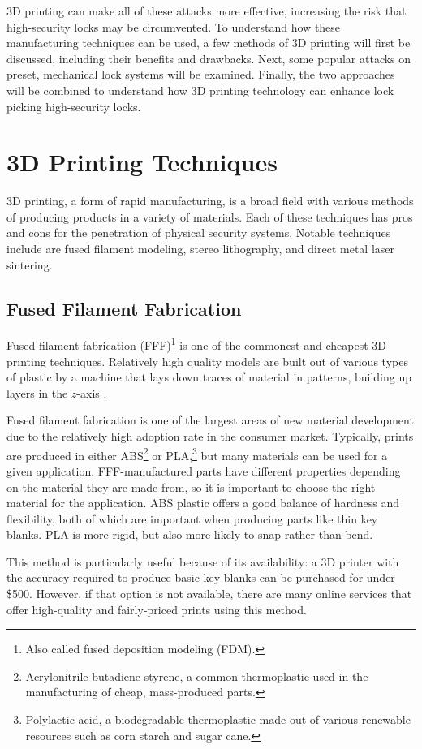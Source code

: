 \documentclass{acm_proc_article-sp}
\begin{document}
3D printing can make all of these attacks more effective, increasing the risk that high-security locks may be circumvented. To understand how these manufacturing techniques can be used, a few methods of 3D printing will first be discussed, including their benefits and drawbacks. Next, some popular attacks on preset, mechanical lock systems will be examined. Finally, the two approaches will be combined to understand how 3D printing technology can enhance lock picking high-security locks.

\section{3D Printing Techniques}
3D printing, a form of rapid manufacturing, is a broad field with various methods of producing products in a variety of materials. Each of these techniques has pros and cons for the penetration of physical security systems. Notable techniques include are fused filament modeling, stereo lithography, and direct metal laser sintering.

\subsection{Fused Filament Fabrication}
Fused filament fabrication (FFF)\footnote{Also called fused deposition modeling (FDM).} is one of the commonest and cheapest 3D printing techniques. Relatively high quality models are built out of various types of plastic by a machine that lays down traces of material in patterns, building up layers in the $z$-axis \cite{VALAVAARA}.

Fused filament fabrication is one of the largest areas of new material development due to the relatively high adoption rate in the consumer market. Typically, prints are produced in either ABS\footnote{Acrylonitrile butadiene styrene, a common thermoplastic used in the manufacturing of cheap, mass-produced parts.} or PLA,\footnote{Polylactic acid, a biodegradable thermoplastic made out of various renewable resources such as corn starch and sugar cane.} but many materials can be used for a given application. FFF-manufactured parts have different properties depending on the material they are made from, so it is important to choose the right material for the application. ABS plastic offers a good balance of hardness and flexibility, both of which are important when producing parts like thin key blanks. PLA is more rigid, but also more likely to snap rather than bend.

This method is particularly useful because of its availability: a 3D printer with the accuracy required to produce basic key blanks can be purchased for under \$500. However, if that option is not available, there are many online services that offer high-quality and fairly-priced prints using this method.
\end{document}
